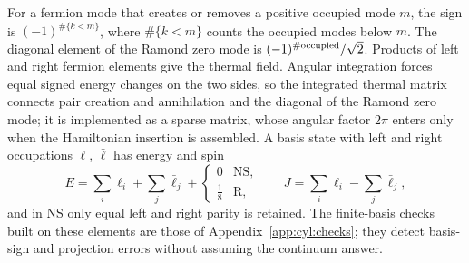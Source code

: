 \documentclass[11pt,a4paper]{article}
\numberwithin{equation}{section}
\begin{document}
For a fermion mode that creates or removes a positive occupied mode $m$, the sign is $(-1)^{\#\{k<m\}}$, where
$\#\{k<m\}$ counts the occupied modes below $m$. The diagonal element of the Ramond zero mode is $(-1)^{\#{\rm occupied}}/\sqrt2$. Products of left
and right fermion elements give the thermal field. Angular integration forces equal signed energy changes on the two
sides, so the integrated thermal matrix connects pair creation and annihilation and the diagonal of the Ramond zero
mode; it is implemented as a sparse matrix, whose angular factor $2\pi$ enters only when the Hamiltonian insertion is
assembled. A basis state with left and right occupations $\boldsymbol\ell$, $\bar{\boldsymbol\ell}$ has energy and spin
\begin{equation}
 E=\sum_i\ell_i+\sum_j\bar\ell_j+\begin{cases}0&\text{NS},\\ \frac18&\text{R},\end{cases}\qquad
 J=\sum_i\ell_i-\sum_j\bar\ell_j,
\end{equation}
and in NS only equal left and right parity is retained. The finite-basis checks built on these elements are those of
Appendix~\ref{app:cyl:checks}; they detect basis-sign and projection errors without assuming the continuum answer.

\end{document}
